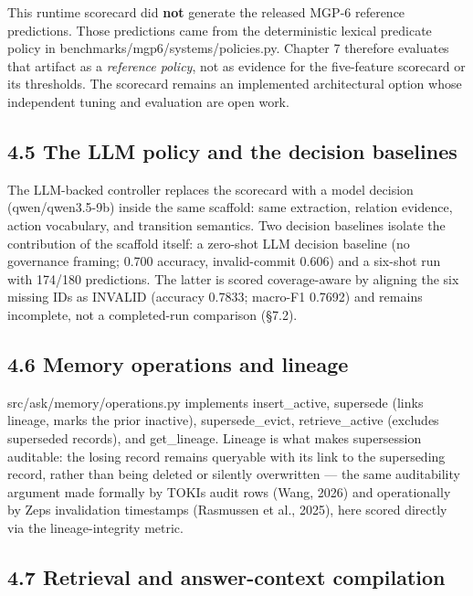 This runtime scorecard did \textbf{not} generate the released MGP-6
reference predictions. Those predictions came from the deterministic
lexical predicate policy in benchmarks/mgp6/systems/policies.py. Chapter
7 therefore evaluates that artifact as a \emph{reference policy}, not as
evidence for the five-feature scorecard or its thresholds. The scorecard
remains an implemented architectural option whose independent tuning and
evaluation are open work.

\subsection{4.5 The LLM policy and the decision
baselines}\label{the-llm-policy-and-the-decision-baselines}

The LLM-backed controller replaces the scorecard with a model decision
(qwen/qwen3.5-9b) inside the same scaffold: same extraction, relation
evidence, action vocabulary, and transition semantics. Two decision
baselines isolate the contribution of the scaffold itself: a zero-shot
LLM decision baseline (no governance framing; 0.700 accuracy,
invalid-commit 0.606) and a six-shot run with 174/180 predictions. The
latter is scored coverage-aware by aligning the six missing IDs as
INVALID (accuracy 0.7833; macro-F1 0.7692) and remains incomplete, not a
completed-run comparison (§7.2).

\subsection{4.6 Memory operations and
lineage}\label{memory-operations-and-lineage}

src/ask/memory/operations.py implements insert\_active, supersede (links
lineage, marks the prior inactive), supersede\_evict, retrieve\_active
(excludes superseded records), and get\_lineage. Lineage is what makes
supersession auditable: the losing record remains queryable with its
link to the superseding record, rather than being deleted or silently
overwritten --- the same auditability argument made formally by
TOKI\textquotesingle s audit rows (Wang, 2026) and operationally by
Zep\textquotesingle s invalidation timestamps (Rasmussen et al., 2025),
here scored directly via the lineage-integrity metric.

\subsection{4.7 Retrieval and answer-context
compilation}\label{retrieval-and-answer-context-compilation}

